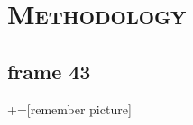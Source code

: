 \documentclass[xcolor=x11names,compress,8pt]{beamer}
\renewcommand{\(}{\begin{columns}}
\renewcommand{\)}{\end{columns}}
\newcommand{\<}[1]{\begin{column}{#1}}
\renewcommand{\>}{\end{column}}
\begin{document}

%
%
%
%
%
%
\section{\scshape Methodology}
\subsection{frame 43}

+=[remember picture]

\everymath{\displaystyle}
\end{document}

